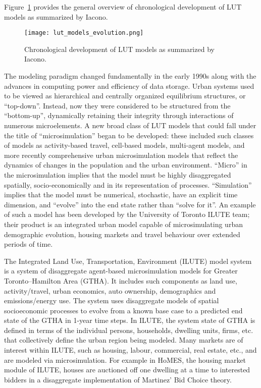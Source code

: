 Figure~\ref{fig:lut_model_evolution} provides the general overview of chronological development of LUT models as summarized by Iacono\cite{Iacono2008}.

\begin{figure}[hbt!]
    \centering
    \texttt{[image: lut\_models\_evolution.png]}
    \caption{Chronological development of LUT models as summarized by Iacono\cite{Iacono2008}.}
    \label{fig:lut_model_evolution}
\end{figure}

The modeling paradigm changed fundamentally in the early 1990s along with the advances in computing power and efficiency of data storage.
Urban systems used to be viewed as hierarchical and centrally organized equilibrium structures, or ``top-down''.
Instead, now they were considered to be structured from the ``bottom-up'', dynamically retaining their integrity through interactions of numerous microelements\cite{Batty2008}.
A new broad class of LUT models that could fall under the title of ``microsimulation'' began to be developed: these included such classes of models as activity-based travel, cell-based models, multi-agent models, and more recently comprehensive urban microsimulation models that reflect the dynamics of changes in the population and the urban environment\cite{Iacono2008}.
``Micro'' in the microsimulation implies that the model must be highly disaggregated spatially, socio-economically and in its representation of processes.
``Simulation'' implies that the model must be numerical, stochastic, have an explicit time dimension, and ``evolve'' into the end state rather than ``solve for it''\cite{Miller2019}.
An example of such a model has been developed by the University of Toronto ILUTE team;
their product is an integrated urban model capable of microsimulating urban demographic evolution, housing markets and travel behaviour over extended periods of time\cite{Miller2018a}.

The Integrated Land Use, Transportation, Environment (ILUTE) model system is a system of disaggregate agent-based microsimulation models for Greater Toronto--Hamilton Area (GTHA).
It includes such components as land use, activity/travel, urban economics, auto ownership, demographics and emissions/energy use.
The system uses disaggregate models of spatial socioeconomic processes to evolve from a known base case to a predicted end state of the GTHA in 1-year time steps\cite{Miller2011}.
In ILUTE, the system state of GTHA is defined in terms of the individual persons, households, dwelling units, firms, etc.
that collectively define the urban region being modeled.
Many markets are of interest within ILUTE, such as housing, labour, commercial, real estate, etc., and are modeled via microsimulation.
For example in HoMES, the housing market module of ILUTE, houses are auctioned off one dwelling at a time to interested bidders in a disaggregate implementation of Martinez' Bid Choice theory\cite{Rosenfield2013,Martinez1992}.


